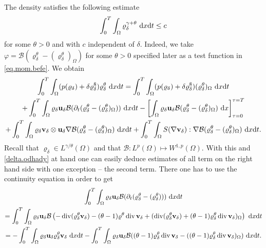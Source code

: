 \documentclass{article}
\DeclareMathOperator{\diver}{div}
\newcommand{\bu}{{\bf u}}
\newcommand{\vu}{\bu}
\newcommand{\bv}{{\bf v}}
\newcommand{\vv}{\bv}
\newcommand{\pat}{\partial_t}
\numberwithin{equation}{section}
\begin{document}
The density satisfies the following estimate
\begin{equation}\label{high.reg.rho}
\int_0^T\int_\Omega \varrho_\delta^{\gamma + \theta} \ {\rm d}x{\rm d}t\leq c
\end{equation}
for  some $\theta>0$ and with $c$ independent of $\delta$. Indeed, we take $\varphi = \mathcal B(\varrho_\delta^\theta - (\varrho_\delta^\theta)_{\Omega})$ for some $\theta>0$ specified later as a test function in \eqref{eq.mom.befe}. We obtain
\begin{multline*}
\int_0^T\int_\Omega (p(\varrho_\delta) + \delta \varrho_\delta^8)\varrho_\delta^\theta \ {\rm d}x{\rm d}t  = \int_0^T\int_\Omega (p(\varrho_\delta) + \delta\varrho_\delta^8)(\varrho_\delta^\theta)_\Omega \ {\rm d}x{\rm d}t\\
%
 + \int_0^T\int_\Omega \varrho_\delta \vu_\delta \mathcal B(\pat (\varrho_\delta^\theta - (\varrho_\delta^\theta)_\Omega))\ {\rm d}x{\rm d}t - \left[\int_\Omega \varrho_\delta\vu_\delta \mathcal B(\varrho_\delta^\theta - (\varrho_\delta^\theta)_\Omega)\ {\rm d}x\right]_{\tau = 0}^{\tau = T}\\
%
 + \int_0^T \int_\Omega \varrho_\delta \vv_\delta \otimes \vu_\delta \nabla \mathcal B(\varrho_\delta^\theta - (\varrho_\delta^\theta)_\Omega)\ {\rm d}x{\rm d}t + \int_0^T\int_\Omega S(\nabla \vv_\delta): \nabla \mathcal B(\varrho_\delta^\theta - (\varrho_\delta^\theta)_{\Omega})\ {\rm d}x{\rm d}t.
\end{multline*}
Recall that $\varrho_\delta \in L^{\gamma/\theta}(\Omega)$ and that $\mathcal B: L^p(\Omega)\mapsto W^{1,p}(\Omega)$. With this and \eqref{delta.odhady} at hand one can easily deduce estimates of all term on the right hand side with one exception -- the second term. There one has to use the continuity equation in order to get
\begin{multline*}
\int_0^T\int_\Omega \varrho_\delta \vu_\delta \mathcal B(\pat(\varrho_\delta^\theta - (\varrho_\delta^\theta)))\ {\rm d}x{\rm d}t\\
%
= \int_0^T\int_\Omega \varrho_\delta \vu_\delta \mathcal B \left(-\diver(\varrho_\delta^\theta \vv_\delta) - (\theta-1)\varrho^\theta \diver \vv_\delta + (\diver (\varrho_\delta^\theta \vv_\delta) + (\theta-1)\varrho_\delta^\theta \diver \vv_\delta)_\Omega\right)\ {\rm d}x{\rm d}t \\
%
= -\int_0^T\int_\Omega \varrho_\delta \vu_\delta \varrho_\delta^\theta \vv_\delta\ {\rm d}x{\rm d}t  - \int_0^T\int_\Omega \varrho_\delta \vu_\delta \mathcal B((\theta - 1)\varrho_\delta^\theta \diver \vv_\delta - ((\theta-1) \varrho_\delta^\theta \diver \vv_\delta)_\Omega)\ {\rm d}x{\rm d}t. 
\end{multline*}
\end{document}
